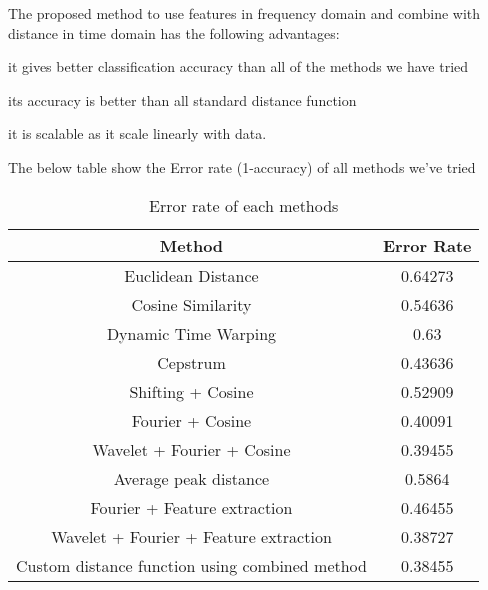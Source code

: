 The proposed method to use features in frequency domain and combine with distance in time domain has the following advantages:
\bit
\item it gives better classification accuracy than all of the methods we have tried
\item its accuracy is better than all standard distance function
\item it is scalable as it scale linearly with data.
\eit

The below table show the Error rate (1-accuracy) of all methods we've tried

\begin{table}[H]
\caption{Error rate of each methods}
\centering 
\begin{tabular}{c c}
\hline\hline 
Method & Error Rate\\[0.5ex] 
\hline
    Euclidean Distance & 0.64273 \\
    Cosine Similarity & 0.54636 \\
    Dynamic Time Warping & 0.63 \\
    Cepstrum & 0.43636 \\
    Shifting + Cosine & 0.52909 \\
    Fourier + Cosine & 0.40091 \\
    Wavelet + Fourier + Cosine & 0.39455 \\
    Average peak distance & 0.5864 \\ 
    Fourier + Feature extraction & 0.46455 \\ 
    Wavelet + Fourier + Feature extraction  & 0.38727 \\
    Custom distance function using combined method & 0.38455\\
    [1ex]
 
\hline
\end{tabular}
\end{table}
